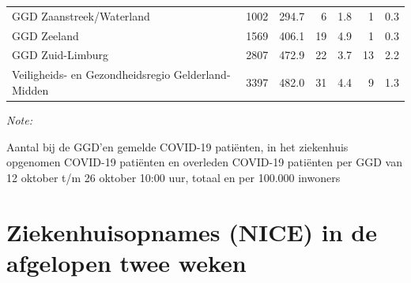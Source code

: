 \documentclass[
  english,
  man,floatsintext]{apa6}
\begin{document}
\begin{table}
\begin{threeparttable}
\begin{tabular}{lrrrrrr}
GGD Zaanstreek/Waterland & 1002 & 294.7 & 6 & 1.8 & 1 & 0.3\\
GGD Zeeland & 1569 & 406.1 & 19 & 4.9 & 1 & 0.3\\
GGD Zuid-Limburg & 2807 & 472.9 & 22 & 3.7 & 13 & 2.2\\
Veiligheids- en Gezondheidsregio Gelderland-Midden & 3397 & 482.0 & 31 & 4.4 & 9 & 1.3\\
\bottomrule
\end{tabular}
\begin{tablenotes}
\item \textit{Note: } 
\item Aantal bij de GGD’en gemelde COVID-19 patiënten, in het ziekenhuis opgenomen COVID-19 patiënten en overleden COVID-19 patiënten per GGD van 12 oktober t/m 26 oktober 10:00 uur, totaal en per 100.000 inwoners
\end{tablenotes}
\end{threeparttable}
\endgroup{}
\end{table}

\newpage

\hypertarget{ziekenhuisopnames-nice-in-de-afgelopen-twee-weken}{%
\section{Ziekenhuisopnames (NICE) in de afgelopen twee weken}\label{ziekenhuisopnames-nice-in-de-afgelopen-twee-weken}}
\end{document}
